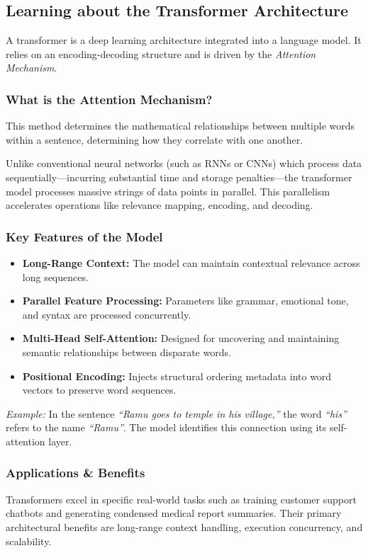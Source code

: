 \documentclass{article}
\begin{document}
\subsection{Learning about the Transformer Architecture}
A transformer is a deep learning architecture integrated into a language model. It relies on an encoding-decoding structure and is driven by the \emph{Attention Mechanism}.

\subsubsection{What is the Attention Mechanism?}
This method determines the mathematical relationships between multiple words within a sentence, determining how they correlate with one another. 

Unlike conventional neural networks (such as RNNs or CNNs) which process data sequentially---incurring substantial time and storage penalties---the transformer model processes massive strings of data points in parallel. This parallelism accelerates operations like relevance mapping, encoding, and decoding.

\subsubsection{Key Features of the Model}
\begin{itemize}
    \item \textbf{Long-Range Context:} The model can maintain contextual relevance across long sequences.
    \item \textbf{Parallel Feature Processing:} Parameters like grammar, emotional tone, and syntax are processed concurrently.
    \item \textbf{Multi-Head Self-Attention:} Designed for uncovering and maintaining semantic relationships between disparate words.
    \item \textbf{Positional Encoding:} Injects structural ordering metadata into word vectors to preserve word sequences.
\end{itemize}
\emph{Example:} In the sentence \emph{``Ramu goes to temple in his village,''} the word \emph{``his''} refers to the name \emph{``Ramu''}. The model identifies this connection using its self-attention layer.

\subsubsection{Applications \& Benefits}
Transformers excel in specific real-world tasks such as training customer support chatbots and generating condensed medical report summaries. Their primary architectural benefits are long-range context handling, execution concurrency, and scalability.
\end{document}
